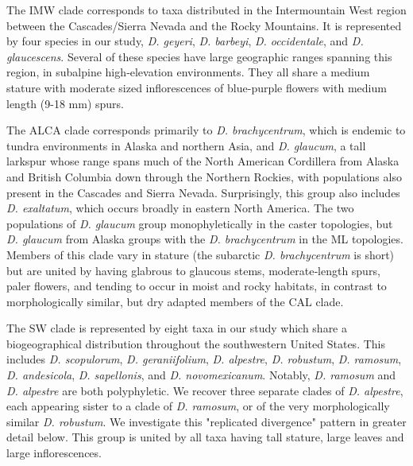 \documentclass[11pt]{article}
\begin{document}
The IMW clade corresponds to taxa distributed in the Intermountain West region 
between the Cascades/Sierra Nevada and the Rocky Mountains.
It is represented by four species in our study, 
\emph{D. geyeri}, \emph{D. barbeyi}, \emph{D. occidentale}, and \emph{D. glaucescens}.
Several of these species have large geographic ranges spanning this region, 
in subalpine high‑elevation environments.
% 
They all share a medium stature with moderate sized inflorescences of blue-purple flowers 
with medium length (9-18 mm) spurs. 

The ALCA clade corresponds primarily to \emph{D. brachycentrum}, which is endemic to 
tundra environments in Alaska and northern Asia, and \emph{D. glaucum}, a tall larkspur 
whose range spans much of the North American Cordillera from Alaska and British Columbia 
down through the Northern Rockies, with populations also present in the Cascades and Sierra Nevada. 
Surprisingly, this group also includes \emph{D. exaltatum}, which occurs broadly in eastern North
America. The two populations of \emph{D. glaucum} group monophyletically in the caster topologies, 
but \emph{D. glaucum} from Alaska groups with the \emph{D. brachycentrum} in the ML topologies.
Members of this clade vary in stature (the subarctic \emph{D. brachycentrum} is short) 
but are united by having glabrous to glaucous stems, moderate‑length spurs, 
paler flowers, and tending to occur in moist and rocky habitats, in contrast to 
morphologically similar, but dry adapted members of the CAL clade.


The SW clade is represented by eight taxa in our study which share a biogeographical
distribution throughout the southwestern United States. This includes
\emph{D. scopulorum}, \emph{D. geraniifolium}, \emph{D. alpestre},
\emph{D. robustum}, \emph{D. ramosum}, \emph{D. andesicola}, \emph{D. sapellonis},
and \emph{D. novomexicanum}. Notably, \emph{D. ramosum} and \emph{D. alpestre}
are both polyphyletic. We recover three separate clades of \emph{D. alpestre}, each
appearing sister to a clade of \emph{D. ramosum}, or of the very morphologically
similar \emph{D. robustum}. We investigate this "replicated divergence" pattern in 
greater detail below. This group is united by all taxa having tall stature, 
large leaves and large inflorescences.


\end{document}
